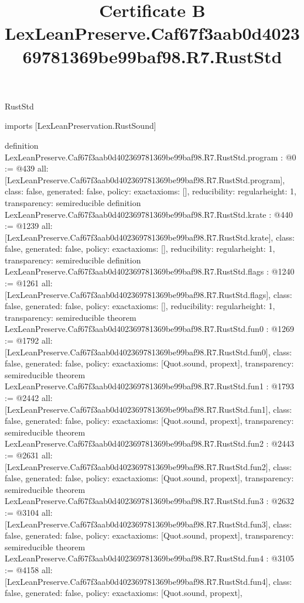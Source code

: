 \begin{lexlean}{RustStd}
\title{Certificate B LexLeanPreserve.Caf67f3aab0d402369781369be99baf98.R7.RustStd}
\begin{coremodule}
imports [LexLeanPreservation.RustSound]

definition LexLeanPreserve.Caf67f3aab0d402369781369be99baf98.R7.RustStd.program : @0 := @439 {
  all: [LexLeanPreserve.Caf67f3aab0d402369781369be99baf98.R7.RustStd.program],
  class: false,
  generated: false,
  policy: exact{axioms: []},
  reducibility: regular{height: 1},
  transparency: semireducible
}
definition LexLeanPreserve.Caf67f3aab0d402369781369be99baf98.R7.RustStd.krate : @440 := @1239 {
  all: [LexLeanPreserve.Caf67f3aab0d402369781369be99baf98.R7.RustStd.krate],
  class: false,
  generated: false,
  policy: exact{axioms: []},
  reducibility: regular{height: 1},
  transparency: semireducible
}
definition LexLeanPreserve.Caf67f3aab0d402369781369be99baf98.R7.RustStd.flags : @1240 := @1261 {
  all: [LexLeanPreserve.Caf67f3aab0d402369781369be99baf98.R7.RustStd.flags],
  class: false,
  generated: false,
  policy: exact{axioms: []},
  reducibility: regular{height: 1},
  transparency: semireducible
}
theorem LexLeanPreserve.Caf67f3aab0d402369781369be99baf98.R7.RustStd.fun0 : @1269 := @1792 {
  all: [LexLeanPreserve.Caf67f3aab0d402369781369be99baf98.R7.RustStd.fun0],
  class: false,
  generated: false,
  policy: exact{axioms: [Quot.sound, propext]},
  transparency: semireducible
}
theorem LexLeanPreserve.Caf67f3aab0d402369781369be99baf98.R7.RustStd.fun1 : @1793 := @2442 {
  all: [LexLeanPreserve.Caf67f3aab0d402369781369be99baf98.R7.RustStd.fun1],
  class: false,
  generated: false,
  policy: exact{axioms: [Quot.sound, propext]},
  transparency: semireducible
}
theorem LexLeanPreserve.Caf67f3aab0d402369781369be99baf98.R7.RustStd.fun2 : @2443 := @2631 {
  all: [LexLeanPreserve.Caf67f3aab0d402369781369be99baf98.R7.RustStd.fun2],
  class: false,
  generated: false,
  policy: exact{axioms: [Quot.sound, propext]},
  transparency: semireducible
}
theorem LexLeanPreserve.Caf67f3aab0d402369781369be99baf98.R7.RustStd.fun3 : @2632 := @3104 {
  all: [LexLeanPreserve.Caf67f3aab0d402369781369be99baf98.R7.RustStd.fun3],
  class: false,
  generated: false,
  policy: exact{axioms: [Quot.sound, propext]},
  transparency: semireducible
}
theorem LexLeanPreserve.Caf67f3aab0d402369781369be99baf98.R7.RustStd.fun4 : @3105 := @4158 {
  all: [LexLeanPreserve.Caf67f3aab0d402369781369be99baf98.R7.RustStd.fun4],
  class: false,
  generated: false,
  policy: exact{axioms: [Quot.sound, propext]},
}
\end{coremodule}
\end{lexlean}
